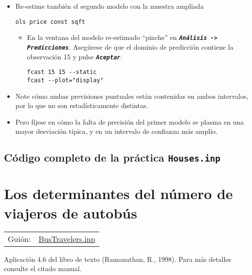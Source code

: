 \documentclass[11pt]{article}
\begin{document}
\begin{description}
\begin{itemize}
\item Re-estime también el segundo modelo con la muestra ampliada
\begin{verbatim}
ols price const sqft
\end{verbatim}

\begin{itemize}
\item En la ventana del modelo re-estimado ``pinche'' en \textbf{\emph{\texttt{Análisis
      -> Predicciones}}}. Asegúrese de que el dominio de predicción
contiene la observación 15 y pulse \textbf{\emph{\texttt{Aceptar}}}.
\begin{verbatim}
fcast 15 15 --static
fcast --plot="display"
\end{verbatim}
\end{itemize}

\item Note cómo ambas previsiones puntuales están contenidas en
ambos intervalos, por lo que no son estadísticamente distintas.

\item Pero fíjese en cómo la falta de precisión del primer modelo se
plasma en una mayor desviación típica, y en un intervalo de
confianza más amplio.
\end{itemize}
\end{description}
\subsection{Código completo de la práctica \texttt{Houses.inp}}
\label{sec:orga940e3e}

\clearpage


\section{Los determinantes del número de viajeros de autobús}
\label{sec:orgbc38b3f}
\begin{center}
\begin{tabular}{ll}
Guión: & \href{https://github.com/mbujosab/Ectr/tree/master/Practicas/Gretl/scripts/BusTravelers.inp}{BusTravelers.inp}\\[0pt]
\end{tabular}
\end{center}

Aplicación 4.6 del libro de texto (Ramanathan, R., 1998). Para más
detalles consulte el citado manual.
\end{document}
